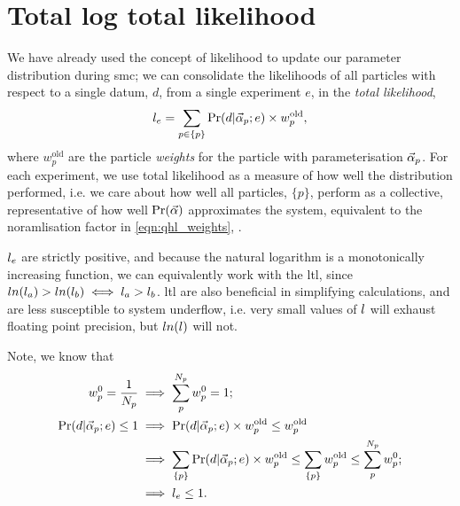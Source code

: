 \section{Total log total likelihood}\label{sec:total_log_total_likelihood}
We have already used the concept of  \gls{likelihood} to update our parameter distribution during \gls{smc}; 
    we can consolidate the \glspl{likelihood}  of all \glspl{particle} with respect to a single datum, $d$, from a single \gls{experiment} $e$,  
    in the \emph{total likelihood}, 
    \begin{equation}
        \label{eqn:total_likelihood}
        l_{e} = \sum\limits_{p \in \{p\}} \Pr(d | \vec{\alpha}_p ; e) \times w_p^{\textrm{old}},
    \end{equation}
    where $w_p^{\textrm{old}}$ are the \gls{particle} \emph{weights} for the \gls{particle} with parameterisation $\vec{\alpha}_p$.
For each experiment, we use total \gls{likelihood} as a measure of how well the distribution performed,
    i.e. we care about how well all \glspl{particle}, $\{p\}$, perform as a collective, representative of how well $\Pr(\vec{\alpha})$ approximates the system,
    equivalent to the noramlisation factor in \cref{eqn:qhl_weights}, \cite{granade2015characterizationp92}. 

$l_{e}$ are strictly positive, and because the natural logarithm is a monotonically increasing function, 
    we can equivalently work with the \gls{ltl}, 
    since $ln(l_a) > ln(l_b) \iff l_a > l_b$. 
\gls{ltl} are also beneficial in simplifying calculations, 
    and are less susceptible to system underflow, 
    i.e. very small values of $l$ will exhaust floating point precision, 
    but $ln(l)$ will not. 
\par 

Note, we know that
\begin{align}    
    \label{eqn:likelihood_deriv}
    \begin{split}
        w_p^0 = \frac{1}{N_p} & \implies \sum_p^{N_p} w_p^0 = 1 ; \\
        \Pr(d | \vec{\alpha}_p; e) \leq 1 & \implies \Pr(d | \vec{\alpha}_p; e) \times w_p^{\textrm{old}} \leq w_p^{\textrm{old}} \\
        & \implies \sum\limits_{\{p\}} \Pr(d | \vec{\alpha}_p; e) \times w_p^{\textrm{old}} \leq \sum\limits_{\{p\}} w_p^{\textrm{old}} \leq \sum_p^{N_p} w_p^0; \\
        & \implies l_{e} \leq 1.
    \end{split}
\end{align}

